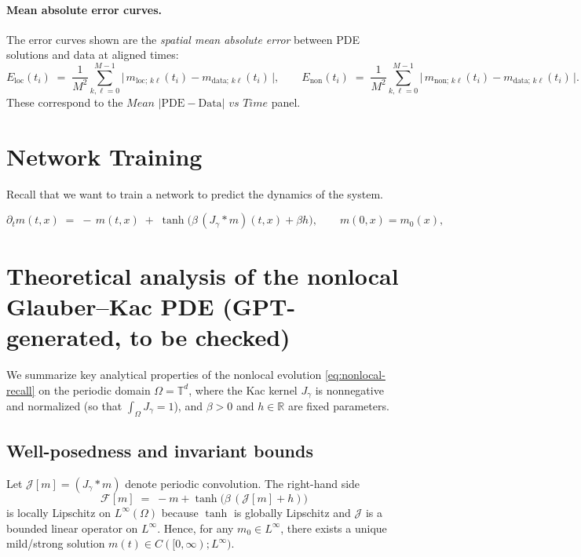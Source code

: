 \documentclass[11pt,a4paper]{article}
\begin{document}
\paragraph{Mean absolute error curves.} The error curves shown are the \emph{spatial mean absolute error} between PDE solutions and data at aligned times:
\begin{equation}
    E_{\text{loc}}(t_i) \;=\; \frac{1}{M^2} \sum_{k,\ell=0}^{M-1} \big|\, m_{\text{loc};\,k\ell}(t_i) - m_{\text{data};\,k\ell}(t_i) \,\big|,
    \qquad
    E_{\text{non}}(t_i) \;=\; \frac{1}{M^2} \sum_{k,\ell=0}^{M-1} \big|\, m_{\text{non};\,k\ell}(t_i) - m_{\text{data};\,k\ell}(t_i) \,\big|.
\end{equation}
These correspond to the $\textit{Mean $|\mathrm{PDE}-\mathrm{Data}|$ vs Time}$ panel.

\section{Network Training}

Recall that we want to train a network to predict the dynamics of the system.

\begin{equation}\label{eq:nonlocal-recall}
\partial_t m(t,x) \;=\; -\,m(t,x)\;+\;\tanh\!\Big(\beta\, (J_\gamma * m)(t,x) + \beta h\Big), \qquad m(0,x)=m_0(x),
\end{equation}

\section{Theoretical analysis of the nonlocal Glauber--Kac PDE (GPT-generated, to be checked)} 
\label{sec:nonlocal_theory}

We summarize key analytical properties of the nonlocal evolution \eqref{eq:nonlocal-recall} on the periodic domain $\Omega=\mathbb{T}^d$, where the Kac kernel $J_\gamma$ is nonnegative and normalized (so that $\int_\Omega J_\gamma = 1$), and $\beta>0$ and $h\in\mathbb{R}$ are fixed parameters.

\subsection{Well-posedness and invariant bounds}
Let $\mathcal{J}[m] = (J_\gamma * m)$ denote periodic convolution. The right-hand side
\[
\mathcal{F}[m] \;=\; -m + \tanh\big(\beta\,(\mathcal{J}[m] + h)\big)
\]
is locally Lipschitz on $L^\infty(\Omega)$ because $\tanh$ is globally Lipschitz and $\mathcal{J}$ is a bounded linear operator on $L^\infty$. Hence, for any $m_0\in L^\infty$, there exists a unique mild/strong solution $m(t)\in C([0,\infty);L^\infty)$.
\end{document}
